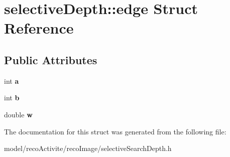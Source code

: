 \section{selective\+Depth\+:\+:edge Struct Reference}
\label{structselective_depth_1_1edge}
\subsection*{Public Attributes}
\begin{DoxyCompactItemize}
\item 
\mbox{\label{structselective_depth_1_1edge_ab45be8e09e44fa7757805524f0603235}} 
int {\bfseries a}
\item 
\mbox{\label{structselective_depth_1_1edge_a156de118dc10a5d81c9783c42b9ff76b}} 
int {\bfseries b}
\item 
\mbox{\label{structselective_depth_1_1edge_a1c6abe5af206afd831d5654c232c21b0}} 
double {\bfseries w}
\end{DoxyCompactItemize}


The documentation for this struct was generated from the following file\+:\begin{DoxyCompactItemize}
\item 
model/reco\+Activite/reco\+Image/selective\+Search\+Depth.\+h\end{DoxyCompactItemize}
